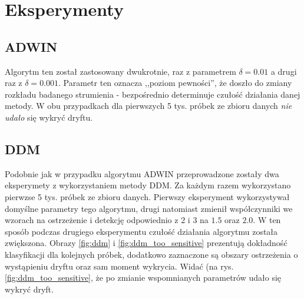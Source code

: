 \documentclass{classrep}
\begin{document}
    \section{Eksperymenty} {

        \subsection{ADWIN} {
            Algorytm ten został zastosowany dwukrotnie, raz z parametrem $\delta=0.01$ a drugi raz z
            $\delta=0.001$. Parametr ten oznacza ,,poziom pewności'', że doszło do zmiany rozkładu
            badanego strumienia - bezpośrednio determinuje czułość działania danej metody. W obu
            przypadkach dla pierwszych 5 tys. próbek ze zbioru danych \emph{nie udało} się wykryć
            dryftu.
        }

        \subsection{DDM} {
            Podobnie jak w przypadku algorytmu ADWIN przeprowadzone zostały dwa eksperymety z
            wykorzystaniem metody DDM. Za każdym razem wykorzystano pierwzse 5 tys. próbek ze zbioru
            danych. Pierwszy eksperyment wykorzystywał domyślne parametry tego algorytmu, drugi
            natomiast zmienił współczynniki we wzorach na ostrzeżenie i detekcję odpowiednio z $2$ i
            $3$ na $1.5$ oraz $2.0$. W ten sposób podczas drugiego eksperymentu czułość działania
            algorytmu została zwiększona. Obrazy \ref{fig:ddm} i \ref{fig:ddm_too_sensitive}
            prezentują dokładność klasyfikacji dla kolejnych próbek, dodatkowo zaznaczone są obszary
            ostrzeżenia o wystąpieniu dryftu oraz sam moment wykrycia. Widać (na rys.
            \ref{fig:ddm_too_sensitive}, że po zmianie wspomnianych parametrów udało się wykryć
            dryft.

}}
\end{document}
